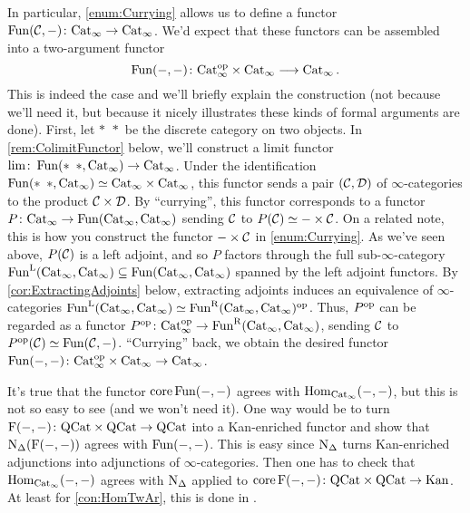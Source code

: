 \begin{exm}
	In particular, \cref{enum:Currying} allows us to define a functor $\operatorname{Fun}(\mathcal{C},-)\colon \mathrm{Cat}_\infty\rightarrow \mathrm{Cat}_\infty$. We'd expect that these functors can be assembled into a two-argument functor
	\begin{equation*}
		\operatorname{Fun}(-,-)\colon \mathrm{Cat}_\infty^{\mathrm{op}}\times\mathrm{Cat}_\infty\longrightarrow \mathrm{Cat}_\infty\,.
	\end{equation*}
	This is indeed the case and we'll briefly explain the construction (not because we'll need it, but because it nicely illustrates these kinds of formal arguments are done). First, let $*\ \,*$ be the discrete category on two objects. In \cref{rem:ColimitFunctor} below, we'll construct a limit functor $\lim\colon \operatorname{Fun}(*\ \,*,\mathrm{Cat}_\infty)\rightarrow \mathrm{Cat}_\infty$. Under the identification $\Fun(*\ \,*,\cat{Cat}_\infty)\simeq \cat{Cat}_\infty\times\cat{Cat}_\infty$, this functor sends a pair $(\mathcal{C},\mathcal{D})$ of $\infty$-categories to the product $\mathcal{C}\times\mathcal{D}$. By \enquote{currying}, this functor corresponds to a functor $P\colon \mathrm{Cat}_\infty\rightarrow \operatorname{Fun}(\mathrm{Cat}_\infty,\mathrm{Cat}_\infty)$ sending $\mathcal{C}$ to $P(\mathcal{C})\simeq -\times\mathcal{C}$. On a related note, this is how you construct the functor $-\times\mathcal{C}$ in \cref{enum:Currying}. As we've seen above, $P(\mathcal{C})$ is a left adjoint, and so $P$ factors through the full sub-$\infty$-category $\operatorname{Fun}^{\mathrm{L}}(\mathrm{Cat}_\infty,\mathrm{Cat}_\infty)\subseteq \operatorname{Fun}(\mathrm{Cat}_\infty,\mathrm{Cat}_\infty)$ spanned by the left adjoint functors. By \cref{cor:ExtractingAdjoints} below, extracting adjoints induces an equivalence of $\infty$-categories $\operatorname{Fun}^{\mathrm{L}}(\mathrm{Cat}_\infty,\mathrm{Cat}_\infty)\simeq \operatorname{Fun}^{\mathrm{R}}(\mathrm{Cat}_\infty,\mathrm{Cat}_\infty)^{\mathrm{op}}$. Thus, $P^{\mathrm{op}}$ can be regarded as a functor $P^{\mathrm{op}}\colon \mathrm{Cat}_\infty^{\mathrm{op}}\rightarrow \operatorname{Fun}^{\mathrm{R}}(\mathrm{Cat}_\infty,\mathrm{Cat}_\infty)$, sending $\mathcal{C}$ to $P^{\mathrm{op}}(\mathcal{C})\simeq \operatorname{Fun}(\mathcal{C},-)$. \enquote{Currying} back, we obtain the desired functor $\operatorname{Fun}(-,-)\colon \mathrm{Cat}_\infty^{\mathrm{op}}\times\mathrm{Cat}_\infty\rightarrow \mathrm{Cat}_\infty$.
	
	It's true that the functor $\operatorname{core}\operatorname{Fun}(-,-)$ agrees with $\operatorname{Hom}_{\mathrm{Cat}_\infty}(-,-)$, but this is not so easy to see (and we won't need it). One way would be to turn $\operatorname{F}(-,-)\colon \mathrm{QCat}\times\mathrm{QCat}\rightarrow \mathrm{QCat}$ into a Kan-enriched functor and show that $\operatorname{N}_\Delta(\operatorname{F}(-,-))$ agrees with $\operatorname{Fun}(-,-)$. This is easy since $\operatorname{N}_\Delta$ turns Kan-enriched adjunctions into adjunctions of $\infty$-categories. Then one has to check that $\operatorname{Hom}_{\mathrm{Cat}_\infty}(-,-)$ agrees with $\operatorname{N}_\Delta$ applied to $\operatorname{core}\operatorname{F}(-,-)\colon\mathrm{QCat}\times\mathrm{QCat}\rightarrow \mathrm{Kan}$. At least for \cref{con:HomTwAr}, this is done in \cite[Proposition~]{HA}.
\end{exm}
